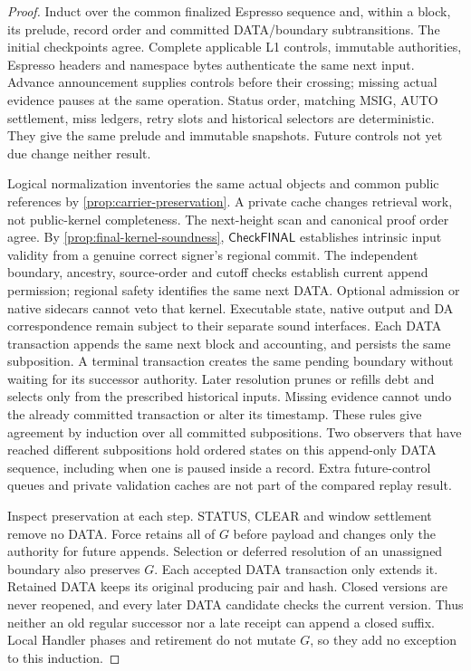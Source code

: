 \documentclass[11pt,a4paper]{article}
\newcommand{\tagg}[1]{\ensuremath{\mathsf{#1}}}
\begin{document}
\begin{proof}
Induct over the common finalized Espresso sequence and, within a block,
its prelude, record order and committed DATA/boundary subtransitions.
The initial checkpoints agree. Complete applicable L1 controls,
immutable authorities, Espresso headers and namespace bytes authenticate
the same next input. Advance announcement supplies controls before their
crossing; missing actual evidence pauses at the same operation. Status
order, matching MSIG, AUTO settlement, miss ledgers, retry slots and
historical selectors are deterministic. They give the same prelude and
immutable snapshots. Future controls not yet due change neither result.

Logical normalization inventories the same actual objects and common
public references by \cref{prop:carrier-preservation}. A private cache
changes retrieval work, not public-kernel completeness. The next-height
scan and canonical proof order agree. By \cref{prop:final-kernel-soundness},
\tagg{CheckFINAL} establishes intrinsic input validity from a genuine
correct signer's regional commit. The independent boundary, ancestry,
source-order and cutoff checks establish current append permission;
regional safety identifies the same next DATA. Optional admission or
native sidecars cannot veto that kernel. Executable state, native output
and DA correspondence remain subject to their separate sound interfaces. Each DATA transaction appends the
same next block and accounting, and persists the same subposition.
A terminal transaction creates the same pending boundary without waiting
for its successor authority. Later resolution prunes or refills debt and
selects only from the prescribed historical inputs. Missing evidence
cannot undo the already committed transaction or alter its timestamp.
These rules give agreement by induction over all committed subpositions.
Two observers that have reached different subpositions hold ordered
states on this append-only DATA sequence, including when one is paused
inside a record. Extra future-control queues and private validation
caches are not part of the compared replay result.

Inspect preservation at each step. STATUS, CLEAR and window settlement
remove no DATA. Force retains all of $G$ before payload and changes only
the authority for future appends. Selection or deferred resolution of an unassigned boundary
also preserves $G$. Each accepted DATA transaction only extends it. Retained DATA keeps its
original producing pair and hash. Closed versions are never reopened,
and every later DATA candidate checks the current version. Thus
neither an old regular successor nor a late receipt can append a closed
suffix. Local Handler phases and retirement do not mutate $G$, so they
add no exception to this induction.
\end{proof}
\end{document}
